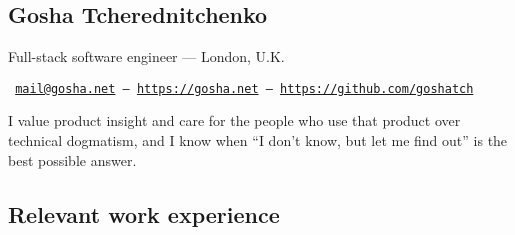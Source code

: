 \documentclass[a4paper,11pt]{article}
\begin{document}
\begin{center}
  \section*{Gosha Tcherednitchenko}
  Full-stack software engineer — London, U.K.

  \texttt{
    \href{mailto:mail@gosha.net}{mail@gosha.net} —
    \href{https://gosha.net}{https://gosha.net} —
    \href{https://github.com/goshatch}{https://github.com/goshatch}
  }
\end{center}

I value product insight and care for the people who use that product over
technical dogmatism, and I know when “I don’t know, but let me find out” is the
best possible answer.

\subsection*{Relevant work experience}
\end{document}
